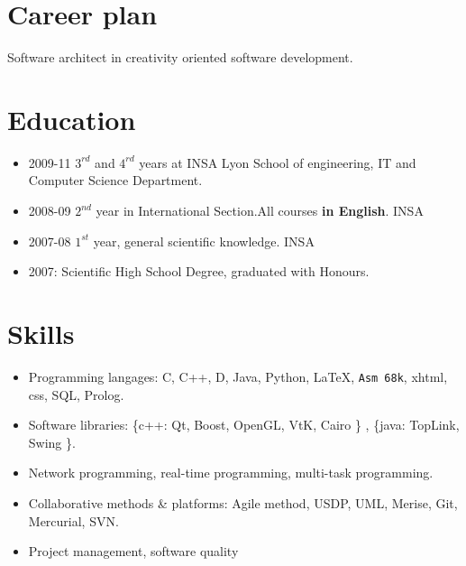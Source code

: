 



\begin{minipage}{0.6\textwidth}
\end{minipage}

\begin{minipage}{0.35\textwidth}
\end{minipage}



\section*{Career plan}
Software architect in creativity oriented software development.

\section*{Education}
	\begin{itemize}
		\item{2009-11} $3^{rd}$ and $4^{rd}$ years at INSA Lyon School of engineering, IT and Computer Science Department.
		\item{2008-09} $2^{nd}$ year in International Section.All courses \textbf{in English}. INSA
		\item{2007-08} $1^{st}$ year, general scientific knowledge. INSA
		\item{2007}: Scientific High School Degree, graduated with Honours.
	\end{itemize}
\section*{Skills}
	\begin{itemize}
		\item Programming langages: C, C++, D, Java, Python, \LaTeX, \texttt{Asm 68k}, xhtml, css, SQL, Prolog. 
		\item Software libraries: {\color{gray}\{c++:} Qt, Boost, OpenGL, VtK, Cairo {\color{gray}\} }, {\color{gray}\{java: } TopLink, Swing {\color{gray}\}}.
		\item Network programming, real-time programming, multi-task programming.
		\item Collaborative methods \& platforms: Agile method, USDP, UML, Merise, Git, Mercurial, SVN.
		\item Project management, software quality
	\end{itemize}
